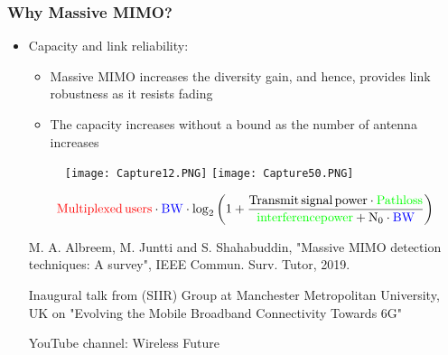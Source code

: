 \documentclass{beamer}
\begin{document}
\begin{frame}[t,fragile=singleslide]\frametitle{Why Massive MIMO?}
\begin{itemize}
\item Capacity and link reliability:
\begin{itemize}
\item Massive MIMO increases the diversity gain, and hence, provides link robustness as it resists fading
\item The capacity increases without a bound as the number of antenna increases
\end{itemize}



\begin{figure}
  \texttt{[image: Capture12.PNG]}
  \texttt{[image: Capture50.PNG]}
\end{figure}

\small $$ \mathrm{ \textcolor{red}{Multiplexed\, users} \cdot \textcolor{blue}{BW} \cdot \log_{2}\left(1+\frac{Transmit\, signal\, power \cdot \textcolor{green}{Pathloss}}{\textcolor{green}{interference power} + N_{0} \cdot \textcolor{blue}{BW}}\right) }$$

\tiny M. A. Albreem, M. Juntti and S. Shahabuddin, "Massive MIMO detection techniques: A survey", IEEE Commun. Surv. Tutor, 2019.

\tiny Inaugural talk from (SIIR) Group at Manchester Metropolitan University, UK on  "Evolving the Mobile Broadband Connectivity Towards 6G"

\tiny YouTube channel: Wireless Future
\end{itemize}
\end{frame}
\end{document}
